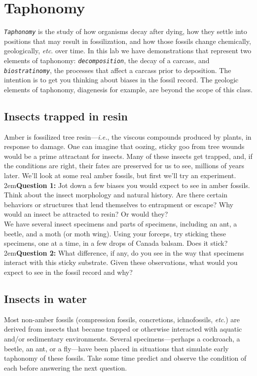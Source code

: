 \documentclass[letterpaper, 11pt]{article}
\newcommand{\latinword}[1]{\texttt{\itshape #1}}%
\begin{document}
\section{Taphonomy}
\latinword{Taphonomy} is the study of how organisms decay after dying, how they settle into positions that may result in fossilization, and how those fossils change chemically, geologically, \textit{etc}. over time. In this lab we have demonstrations that represent two elements of taphonomy: \latinword{decomposition}, the decay of a carcass, and \latinword{biostratinomy}, the processes that affect a carcass prior to deposition. The intention is to get you thinking about biases in the fossil record. The geologic elements of taphonomy, diagenesis for example, are beyond the scope of this class.

\subsection{Insects trapped in resin}
Amber is fossilized tree resin---\textit{i.e.}, the viscous compounds produced by plants, in response to damage. One can imagine that oozing, sticky goo from tree wounds would be a prime attractant for insects. Many of these insects get trapped, and, if the conditions are right, their fates are preserved for us to see, millions of years later. We'll look at some real amber fossils, but first we'll try an experiment.\\

\hangindent2em\textbf{Question 1:} Jot down a few biases you would expect to see in amber fossils. Think about the insect morphology and natural history. Are there certain behaviors or structures that lend themselves to entrapment or escape? Why would an insect be attracted to resin? Or would they?\\

\noindent{}We have several insect specimens and parts of specimens, including an ant, a beetle, and a moth (or moth wing). Using your forceps, try sticking these specimens, one at a time, in a few drops of Canada balsam. Does it stick?\\

\hangindent2em\textbf{Question 2:} What difference, if any, do you see in the way that specimens interact with this sticky substrate. Given these observations, what would you expect to see in the fossil record and why?

\subsection{Insects in water}
Most non-amber fossils (compression fossils, concretions, ichnofossils, \textit{etc}.) are derived from insects that became trapped or otherwise interacted with aquatic and/or sedimentary environments. Several specimens---perhaps a cockroach, a beetle, an ant, or a fly---have been placed in situations that simulate early taphonomy of these fossils. Take some time predict and observe the condition of each before answering the next question.\\
\end{document}
